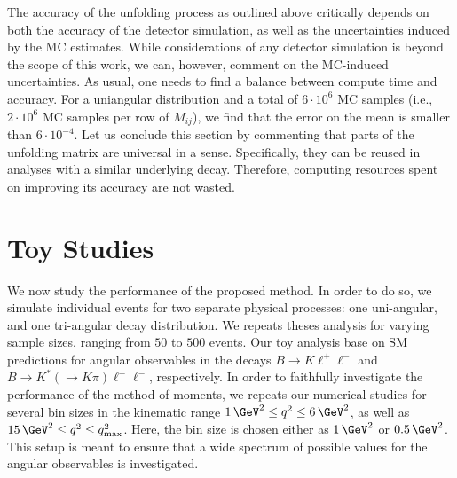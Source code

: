 \documentclass[aps,prd,reprint,nofootinbib,preprintnumbers]{revtex4}
\begin{document}
The accuracy of the unfolding process as outlined above critically depends on both the accuracy
of the detector simulation, as well as the uncertainties induced by the MC estimates. While
considerations of any detector simulation is beyond the scope of this work, we can, however,
comment on the MC-induced uncertainties. As usual, one needs to find a balance between
compute time and accuracy. For a uniangular distribution and a total of $6\cdot 10^6$ MC
samples (i.e., $2 \cdot 10^6$ MC samples per row of $M_{ij}$), we find that the error on the mean is
smaller than $6\cdot 10^{-4}$. Let us conclude this section by commenting that parts of the unfolding
matrix are universal in a sense. Specifically, they can be reused in analyses with a similar underlying decay.
Therefore, computing resources spent on improving its accuracy are not wasted.


\section{Toy Studies}
\label{sec:numerics}

We now study the performance of the proposed method. In order to do so, we simulate
individual events for two separate physical processes: one uni-angular, and one tri-angular decay
distribution. We repeats theses analysis for varying sample sizes, ranging from
$50$ to $500$ events. Our toy analysis base on SM predictions for angular observables
in the decays $B\to K\ell^+\ell^-$ and $B\to K^*(\to K\pi)\ell^+\ell^-$, respectively.
In order to faithfully investigate the performance of the method of moments, we repeats our
numerical studies for several bin sizes in the kinematic range $1\,\GeV^2 \leq q^2 \leq 6\,\GeV^2$,
as well as $15\,\GeV^2 \leq q^2 \leq q^2_\text{max}$. Here, the bin size is chosen either
as $1\,\GeV^2$ or $0.5\,\GeV^2$. This setup is meant to ensure that a wide spectrum of possible
values for the angular observables is investigated.\\
\end{document}
